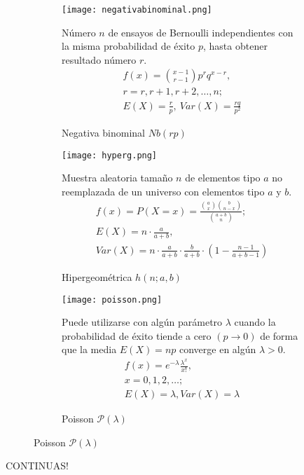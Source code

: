 \begin{figure}[H]	
	\begin{subfigure}[t]{.5\textwidth}
		\texttt{[image: negativabinominal.png]}\caption{Negativa binominal $Nb(rp)$}
		Número $n$ de ensayos de Bernoulli independientes con la misma probabilidad de éxito $p$, hasta obtener resultado número $r$.
		\begin{equation}
		\begin{matrix}
		f(x)=\binom{x-1}{r-1}p^rq^{x-r},\\
		r=r,r+1,r+2,\ldots,n;\\
		E(X)=\frac{r}{p},\ Var(X)=\frac{rq}{p^2}
		\end{matrix}
		\end{equation}
	\end{subfigure}\qquad
\begin{subfigure}[t]{.5\textwidth}
		\texttt{[image: hyperg.png]}\caption{Hipergeométrica $h(n;a,b)$}
		Muestra aleatoria tamaño $n$ de elementos tipo $a$ no reemplazada de un universo con elementos tipo $a$ y $b$.
		\begin{equation}
		\begin{matrix}
		f(x)=P(X=x)=\frac{\binom{a}{x}\binom{b}{n-x}}{\binom{a+b}{n}};\\
		E(X)=n\cdot\frac{a}{a+b},\\
		Var(X)=n\cdot\frac{a}{a+b}\cdot\frac{b}{a+b}\cdot(1-\frac{n-1}{a+b-1})
\end{matrix}
		\end{equation}
	\end{subfigure}\qquad
\begin{subfigure}[t]{.5\textwidth}
	\texttt{[image: poisson.png]}\caption{Poisson $\mathcal{P}(\lambda)$}
Puede utilizarse con algún parámetro $\lambda$ cuando la probabilidad de éxito tiende a cero $(p\rightarrow0)$ de forma que la media $E(X)=np$ converge en algún $\lambda>0$.
	\begin{equation}
	\begin{matrix}
f(x)=e^{-\lambda}\frac{\lambda^x}{x!},\\
x=0,1,2,\ldots;\\
	E(X)=\lambda, Var(X)=\lambda
	\end{matrix}
	\end{equation}
\end{subfigure}
\end{figure}
CONTINUAS!
